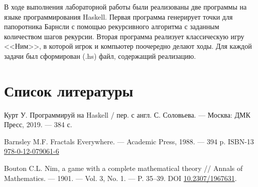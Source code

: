 \documentclass[11pt,a4paper,final]{article} %
\begin{document}
В ходе выполнения лабораторной работы были реализованы две программы на языке программирования Haskell. Первая программа генерирует точки для папоротника Барнсли с помощью рекурсивного алгоритма с заданным количеством шагов рекурсии. Вторая программа реализует классическую игру <<Ним>>, в которой игрок и компьютер поочередно делают ходы. Для каждой задачи был сформирован (.hs) файл, содержащий реализацию.


\newpage
\section*{Список литературы}

\begin{enumerate}[label={[\arabic*]}]
	\item Курт У. Программируй на Haskell / пер. с англ. С. Соловьева. — Москва: ДМК Пресс, 2019. — 384 с.
	
	\item Barnsley M.F. Fractals Everywhere. — Academic Press, 1988. — 394 p. ISBN-13 \href{https://isbnsearch.org/isbn/9780120790616}{978-0-12-079061-6}
	
	\item Bouton C.L. Nim, a game with a complete mathematical theory // Annals of Mathematics. — 1901. — Vol. 3, No. 1. — P. 35–39. DOI \href{https://doi.org/10.2307/1967631}{10.2307/1967631}.
\end{enumerate}
\end{document}
